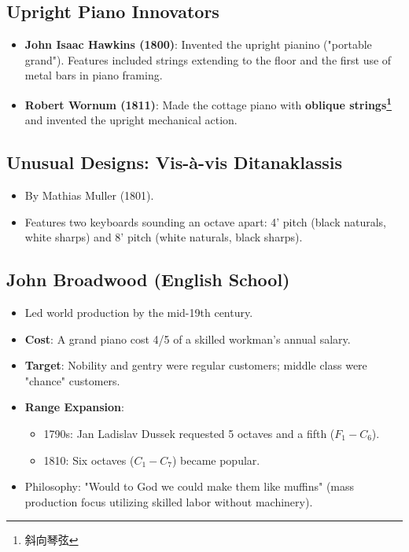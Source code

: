 \documentclass[math,code]{amznotes}
\theoremstyle{remark}
\begin{document}
\subsection{Upright Piano Innovators}
\begin{itemize}
    \item \textbf{John Isaac Hawkins (1800)}: Invented the upright pianino ("portable grand"). Features included strings extending to the floor and the first use of metal bars in piano framing.
    \item \textbf{Robert Wornum (1811)}: Made the cottage piano with \textbf{oblique strings\footnote{斜向琴弦}} and invented the upright mechanical action.
\end{itemize}

\subsection{Unusual Designs: Vis-à-vis Ditanaklassis}
\begin{itemize}
    \item By Mathias Muller (1801).
    \item Features two keyboards sounding an octave apart: 4' pitch (black naturals, white sharps) and 8' pitch (white naturals, black sharps).
\end{itemize}

\subsection{John Broadwood (English School)}
\begin{itemize}
    \item Led world production by the mid-19th century.
    \item \textbf{Cost}: A grand piano cost 4/5 of a skilled workman's annual salary.
    \item \textbf{Target}: Nobility and gentry were regular customers; middle class were "chance" customers.
    \item \textbf{Range Expansion}:
    \begin{itemize}
        \item 1790s: Jan Ladislav Dussek requested 5 octaves and a fifth ($F_1-C_6$).
        \item 1810: Six octaves ($C_1-C_7$) became popular.
    \end{itemize}
    \item Philosophy: "Would to God we could make them like muffins" (mass production focus utilizing skilled labor without machinery).
\end{itemize}
\end{document}

